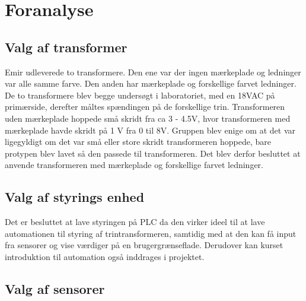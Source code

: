 
\chapter{Foranalyse}

\section{Valg af transformer}
Emir udleverede to transformere. Den ene var der ingen mærkeplade og ledninger var alle samme farve. Den anden har mærkeplade og forskellige farvet ledninger. De to transformere blev begge undersøgt i laboratoriet, med en 18VAC på primærside, derefter måltes spændingen på de forskellige trin. Transformeren uden mærkeplade hoppede små skridt fra ca 3 - 4.5V, hvor transformeren med mærkeplade havde skridt på 1 V fra 0 til 8V. Gruppen blev enige om at det var ligegyldigt om det var små eller store skridt transformeren hoppede, bare protypen blev lavet så den passede til transformeren. Det blev derfor besluttet at anvende transformeren med mærkeplade og forskellige farvet ledninger. 

\section{Valg af styrings enhed}
Det er besluttet at lave styringen på PLC da den virker ideel til at lave automationen til styring af trintransformeren, samtidig med at den kan få input fra sensorer og vise værdiger på en brugergrænseflade. Derudover kan kurset introduktion til automation også inddrages i projektet.

\section{Valg af sensorer}

